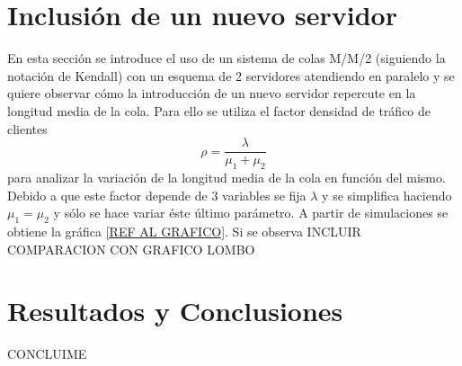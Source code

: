 \documentclass{sig-alternate}
\begin{document}
\section{Inclusi\'on de un nuevo servidor}
\label{sec:mm2}

En esta secci\'on se introduce el uso de un sistema de colas M/M/2 (siguiendo la notaci\'on de Kendall)
con un esquema de 2 servidores atendiendo en paralelo y se quiere observar c\'omo la introducci\'on
de un nuevo servidor repercute en la longitud media de la cola. Para ello se utiliza el factor densidad de tr\'afico de clientes
\begin{equation}
\rho = \frac{\lambda}{\mu_{1} + \mu_{2}}
\end{equation}
para analizar la variaci\'on de la longitud media de la cola en funci\'on del mismo.
Debido a que este factor depende de 3 variables se fija $\lambda$ y se simplifica haciendo
$\mu_{1}=\mu_{2}$ y s\'olo se hace variar \'este \'ultimo par\'ametro.
A partir de simulaciones se obtiene la gr\'afica \ref{REF AL GRAFICO}. Si se observa {INCLUIR COMPARACION CON GRAFICO LOMBO}

\section{Resultados y Conclusiones}
\label{sec:conclusiones}
CONCLUIME



\end{document}
